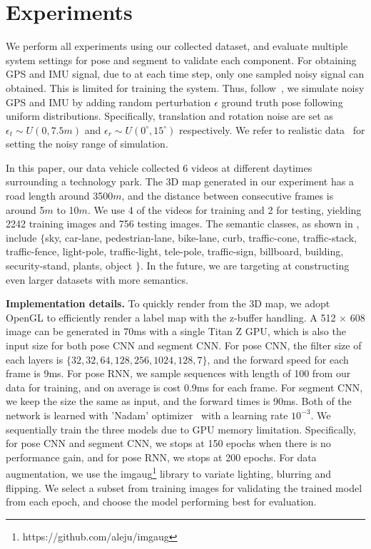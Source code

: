 \section{Experiments}
\label{sec:experiments}
We perform all experiments using our collected dataset, and evaluate multiple system settings for pose and segment to validate each component.
For obtaining GPS and IMU signal, due to at each time step, only one sampled noisy signal can obtained. This is limited for training the system. Thus, follow~\cite{vishal2015accurate}, we simulate noisy GPS and IMU by adding random perturbation $\epsilon$ \wrt ground truth pose following uniform distributions. 
Specifically, translation and rotation noise are set as $\epsilon_t \sim U(0, 7.5m)$ and $\epsilon_r \sim U(0^{\circ}, 15^{\circ})$ respectively. 
We refer to realistic data~\cite{lee2015gps} for setting the noisy range of simulation.

In this paper, our data vehicle collected 6 videos at different daytimes surrounding a technology park. The 3D map generated in our experiment has a road length around 3500$m$, and the distance between consecutive frames is around 5$m$ to 10$m$. We use 4 of the videos for training and 2 for testing, yielding 2242 training images and 756 testing images. The semantic classes, as shown in , include $\{$sky, car-lane, pedestrian-lane, bike-lane, curb, traffic-cone, traffic-stack, traffic-fence, light-pole, traffic-light, tele-pole, traffic-sign, billboard, building, security-stand, plants, object $\}$. In the future, we are targeting at constructing even larger datasets with more semantics.


\textbf{Implementation details.} To quickly render from the 3D map, we adopt OpenGL to efficiently render a label map with the z-buffer handling. A 512 $\times$ 608 image can be generated in 70ms with a single Titan Z GPU, which is also the input size for both pose CNN and segment CNN. 
For pose CNN, the filter size of each layers is $\{32, 32, 64, 128, 256, 1024, 128, 7\}$, and the forward speed for each frame is 9ms. For pose RNN, we sample sequences with length of 100 from our data for training, and on average is cost 0.9ms for each frame.
For segment CNN, we keep the size the same as input, and the forward times is 90ms. 
Both of the network is learned with 'Nadam' optimizer~\cite{dozat2016incorporating} with a learning rate $10^{-3}$. We sequentially train the three models due to GPU memory limitation.
Specifically, for pose CNN and segment CNN, we stops at 150 epochs when there is no performance gain, and for pose RNN, we stops at 200 epochs. For data augmentation, we use the imgaug\footnote{https://github.com/aleju/imgaug} library to variate lighting, blurring and flipping. We select a subset from training images for validating the trained model from each epoch, and choose the model performing best for evaluation.

